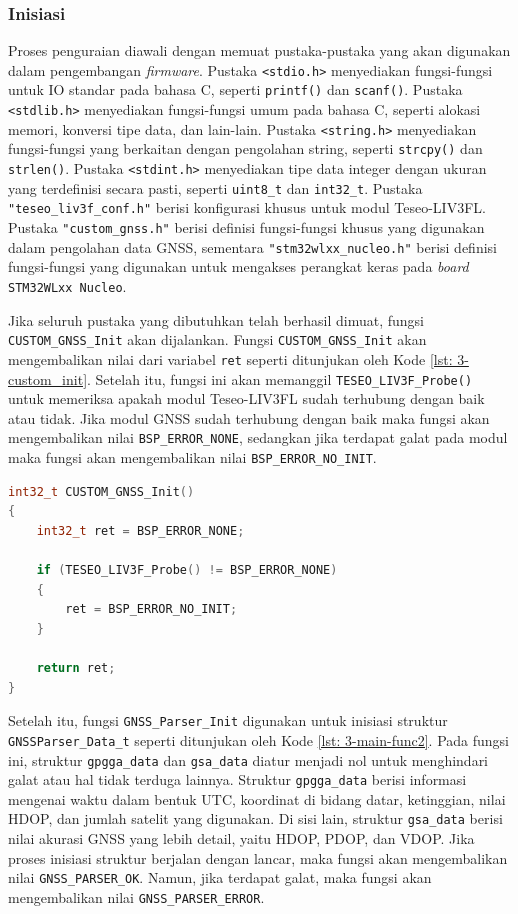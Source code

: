\subsubsection{Inisiasi}
Proses penguraian diawali dengan memuat pustaka-pustaka yang akan digunakan dalam pengembangan \textit{firmware}. Pustaka \texttt{<stdio.h>} menyediakan fungsi-fungsi untuk IO standar pada bahasa C, seperti \texttt{printf()} dan \texttt{scanf()}. Pustaka \texttt{<stdlib.h>} menyediakan fungsi-fungsi umum pada bahasa C, seperti alokasi memori, konversi tipe data, dan lain-lain. Pustaka \texttt{<string.h>} menyediakan fungsi-fungsi yang berkaitan dengan pengolahan string, seperti \texttt{strcpy()} dan \texttt{strlen()}. Pustaka \texttt{<stdint.h>} menyediakan tipe data integer dengan ukuran yang terdefinisi secara pasti, seperti \texttt{uint8\_t} dan \texttt{int32\_t}. Pustaka \texttt{"teseo\_liv3f\_conf.h"} berisi konfigurasi khusus untuk modul Teseo-LIV3FL. Pustaka \texttt{"custom\_gnss.h"} berisi definisi fungsi-fungsi khusus yang digunakan dalam pengolahan data GNSS, sementara \texttt{"stm32wlxx\_nucleo.h"} berisi definisi fungsi-fungsi yang digunakan untuk mengakses perangkat keras pada \textit{board} \texttt{STM32WLxx Nucleo}.

Jika seluruh pustaka yang dibutuhkan telah berhasil dimuat, fungsi \texttt{CUSTOM\_GNSS\_Init} akan dijalankan. Fungsi \texttt{CUSTOM\_GNSS\_Init} akan mengembalikan nilai dari variabel \texttt{ret} seperti ditunjukan oleh Kode \ref{lst: 3-custom_init}. Setelah itu, fungsi ini akan memanggil \texttt{TESEO\_LIV3F\_Probe()} untuk memeriksa apakah modul Teseo-LIV3FL sudah terhubung dengan baik atau tidak. Jika modul GNSS sudah terhubung dengan baik maka fungsi akan mengembalikan nilai \texttt{BSP\_ERROR\_NONE}, sedangkan jika terdapat galat pada modul maka fungsi akan mengembalikan nilai \texttt{BSP\_ERROR\_NO\_INIT}.

\vspace{0.3cm}
\begin{lstlisting}[language=c, style=mystyle, caption={Fungsi \texttt{CUSTOM\_GNSS\_Init} pada \textit{Firmware}}, label={lst: 3-custom_init}]
int32_t CUSTOM_GNSS_Init()
{
	int32_t ret = BSP_ERROR_NONE;

	if (TESEO_LIV3F_Probe() != BSP_ERROR_NONE)
	{
		ret = BSP_ERROR_NO_INIT;
	}

	return ret;
}
\end{lstlisting}

Setelah itu, fungsi \texttt{GNSS\_Parser\_Init} digunakan untuk inisiasi struktur \texttt{GNSSParser\_Data\_t} seperti ditunjukan oleh Kode \ref{lst: 3-main-func2}. Pada fungsi ini, struktur \texttt{gpgga\_data} dan \texttt{gsa\_data} diatur menjadi nol untuk menghindari galat atau hal tidak terduga lainnya. Struktur \texttt{gpgga\_data} berisi informasi mengenai waktu dalam bentuk UTC, koordinat di bidang datar, ketinggian, nilai HDOP, dan jumlah satelit yang digunakan. Di sisi lain, struktur \texttt{gsa\_data} berisi nilai akurasi GNSS yang lebih detail, yaitu HDOP, PDOP, dan VDOP. Jika proses inisiasi struktur berjalan dengan lancar, maka fungsi akan mengembalikan nilai \texttt{GNSS\_PARSER\_OK}. Namun, jika terdapat galat, maka fungsi akan mengembalikan nilai \texttt{GNSS\_PARSER\_ERROR}.

